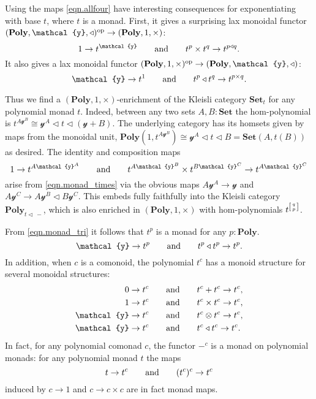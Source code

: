 \documentclass[11pt, one side, article]{memoir}
\makeatletter
\theoremstyle{definition}
\theoremstyle{plain}
\newcommand{\Cat}[1]{\mathbf{#1}}%
\newcommand{\op}{^\tn{op}}
\newcommand{\tn}[1]{\textnormal{#1}}
\newcommand{\smset}{\Cat{Set}}
\newcommand{\yon}{{\mathcal{y}}}
\newcommand{\poly}{\Cat{Poly}}
\newcommand{\0}{\textsf{0}}
\newcommand{\1}{\tn{\textsf{1}}}
\newcommand{\tri}{\mathbin{\triangleleft}}
\newcommand{\biglens}[2]{
     \begin{bmatrix}{\vphantom{f_f^f}#2} \\ {\vphantom{f_f^f}#1} \end{bmatrix}
}
\newcommand{\littlelens}[2]{
     \begin{bsmallmatrix}{\vphantom{f}#2} \\ {\vphantom{f}#1} \end{bsmallmatrix}
}
\newcommand{\lens}[2]{
  \relax\if@display
     \biglens{#1}{#2}
  \else
     \littlelens{#1}{#2}
  \fi
}
\newcommand{\hh}[2][]{#1 \tn{#2} #1}
\newcommand{\qqand}{\hh[\qquad]{and}}
\makeatother
\begin{document}
Using the maps \eqref{eqn.allfour} have interesting consequences for exponentiating with base $t$, where $t$ is a monad. First, it gives a surprising lax monoidal functor $(\poly,\yon,\tri)\op\to(\poly,1,\times)$:
\begin{equation}\label{eqn.monad_times}
	1\to t^\yon
	\qqand
	t^p\times t^q\to t^{p\tri q}.
\end{equation}
It also gives a lax monoidal functor $(\poly,1,\times)\op\to(\poly,\yon,\tri)$:
\begin{equation}\label{eqn.monad_tri}
	\yon\to t^1
	\qqand
	t^p\tri t^q\to t^{p\times q}.
\end{equation}

Thus we find a $(\poly,1,\times)$-enrichment of the Kleisli category $\smset_t$ for any polynomial monad $t$. Indeed, between any two sets $A,B:\smset$ the hom-polynomial is $t^{A\yon^B}\cong \yon^A\tri t\tri(\yon+B)$. The underlying category has its homsets given by maps from the monoidal unit, $\poly(1,t^{A\yon^B})\cong\yon^A\tri t\tri B=\smset(A,t(B))$ as desired. The identity and composition maps
\begin{equation}
	1\to t^{A\yon^A}
	\qqand
	t^{A\yon^B}\times t^{B\yon^C}\to t^{A\yon^C}
\end{equation}
arise from \eqref{eqn.monad_times} via the obvious maps $A\yon^A\to\yon$ and $A\yon^C\to A\yon^B\tri B\yon^C$. This embeds fully faithfully into the Kleisli category $\poly_{t\tri\,-}$, which is also enriched in $(\poly,1,\times)$ with hom-polynomials $t^{\tiny\lens{p}{q}}$.

From \eqref{eqn.monad_tri} it follows that $t^p$ is a monad for any $p:\poly$. 
\begin{equation}\label{eqn.t^p_monad}
	\yon\to t^p\qqand t^p\tri t^p\to t^p.
\end{equation}
In addition, when $c$ is a comonoid, the polynomial $t^c$ has a monoid structure for several monoidal structures:
\begin{align}
  0\to t^c &\qqand t^c + t^c\to t^c,\\
  \label{eqn.t^c_times_monoid}
  1\to t^c &\qqand t^c\times t^c\to t^c,\\
  \yon\to t^c &\qqand t^c\otimes t^c\to t^c,\\\label{eqn.monad_comonad_power}
  \yon\to t^c &\qqand t^c\tri t^c\to t^c.
\end{align}
In fact, for any polynomial comonad $c$, the functor $-^c$ is a monad on polynomial monads: for any polynomial monad $t$ the maps
\begin{equation}
	t\to t^c
	\qqand
	(t^c)^c\to t^c
\end{equation}
induced by $c\to 1$ and $c\to c\times c$ are in fact monad maps.
\end{document}
